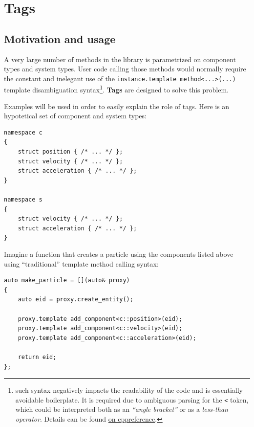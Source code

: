 \documentclass[twoside, 12pt, a4paper, openright]{book}
\begin{document}
\hypertarget{metaprogramming_tags}{\section{Tags}\label{metaprogramming_tags}}

\subsection{Motivation and usage}\label{motivation-and-usage}

A very large number of methods in the library is parametrized on
component types and system types. User code calling those methods would
normally require the constant and inelegant use of the
\texttt{instance.template method<...>(...)}
template disambiguation syntax\footnote{such syntax negatively impacts
  the readability of the code and is essentially avoidable boilerplate.
  It is required due to ambiguous parsing for the
  \texttt{<}
  token, which could be interpreted both as an \emph{``angle bracket''}
  or as a \emph{less-than operator}. Details can be found
  \href{http://en.cppreference.com/w/cpp/language/dependent_name\#The_template_disambiguator_for_dependent_names}{on
  cppreference}.}. \textbf{Tags} are designed to solve this problem.

Examples will be used in order to easily explain the role of tags. Here
is an hypotetical set of component and system types:

\begin{verbatim}
namespace c
{
    struct position { /* ... */ };
    struct velocity { /* ... */ };
    struct acceleration { /* ... */ };
}

namespace s
{
    struct velocity { /* ... */ };
    struct acceleration { /* ... */ };
}
\end{verbatim}

Imagine a function that creates a particle using the components listed
above using ``traditional'' template method calling syntax:

\begin{verbatim}
auto make_particle = [](auto& proxy)
{
    auto eid = proxy.create_entity();

    proxy.template add_component<c::position>(eid);
    proxy.template add_component<c::velocity>(eid);
    proxy.template add_component<c::acceleration>(eid);

    return eid;
};
\end{verbatim}
\end{document}
